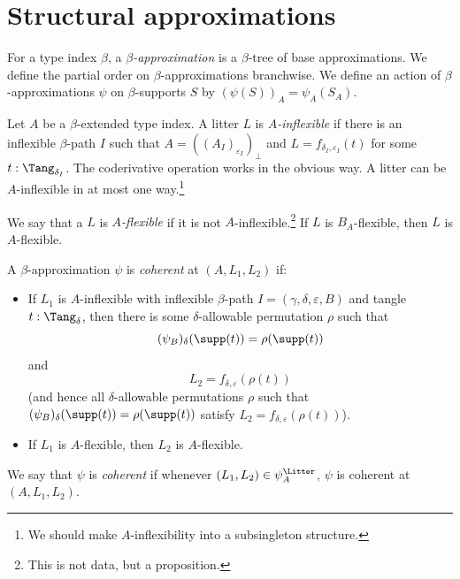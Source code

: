 \section{Structural approximations}
\begin{definition}
  \label{def:StrApprox}
  \leanok
  For a type index \( \beta \), a \emph{\( \beta \)-approximation} is a \( \beta \)-tree of base approximations.
  We define the partial order on \( \beta \)-approximations branchwise.
  We define an action of \( \beta \)-approximations \( \psi \) on \( \beta \)-supports \( S \) by \( (\psi(S))_A = \psi_A(S_A) \).
\end{definition}
\begin{definition}
  \label{def:Inflexible}
  \leanok
  Let \( A \) be a \( \beta \)-extended type index.
  A litter \( L \) is \emph{\( A \)-inflexible} if there is an inflexible \( \beta \)-path \( I \) such that \( A = ((A_I)_{\varepsilon_I})_\bot \) and \( L = f_{\delta_I, \varepsilon_I}(t) \) for some \( t : \Tang_{\delta_I} \).
  The coderivative operation works in the obvious way.
  A litter can be \( A \)-inflexible in at most one way.\footnote{We should make \( A \)-inflexibility into a subsingleton structure.}

  We say that a \( L \) is \emph{\( A \)-flexible} if it is not \( A \)-inflexible.\footnote{This is not data, but a proposition.}
  If \( L \) is \( B_A \)-flexible, then \( L \) is \( A \)-flexible.
\end{definition}
\begin{definition}
  \label{def:StrApprox.Coherent}
  \leanok
  A \( \beta \)-approximation \( \psi \) is \emph{coherent} at \( (A, L_1, L_2) \) if:
  \begin{itemize}
    \item If \( L_1 \) is \( A \)-inflexible with inflexible \( \beta \)-path \( I = (\gamma, \delta, \varepsilon, B) \) and tangle \( t : \Tang_\delta \), then there is some \( \delta \)-allowable permutation \( \rho \) such that
    \[ (\psi_B)_\delta(\supp(t)) = \rho(\supp(t)) \]
    and
    \[ L_2 = f_{\delta,\varepsilon}(\rho(t)) \]
    (and hence all \( \delta \)-allowable permutations \( \rho \) such that \( (\psi_B)_\delta(\supp(t)) = \rho(\supp(t)) \) satisfy \( L_2 = f_{\delta,\varepsilon}(\rho(t)) \)).
    \item If \( L_1 \) is \( A \)-flexible, then \( L_2 \) is \( A \)-flexible.
  \end{itemize}
  We say that \( \psi \) is \emph{coherent} if whenever \( (L_1, L_2) \in \psi_A^\Litter \), \( \psi \) is coherent at \( (A, L_1, L_2) \).
\end{definition}
